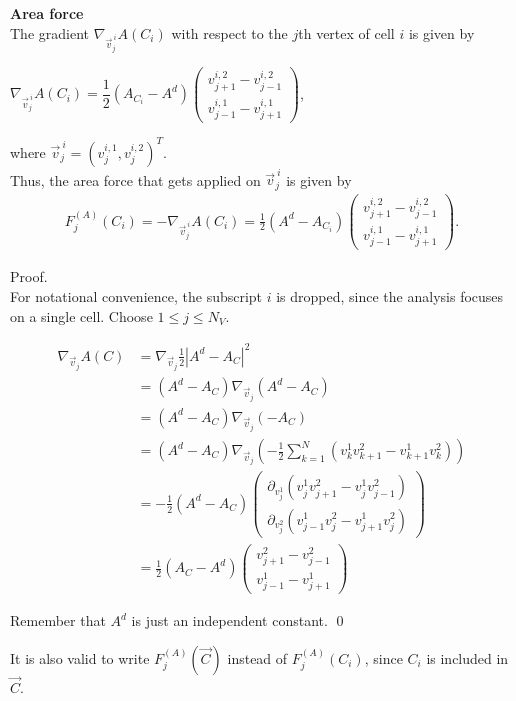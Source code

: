 \begin{proposition} \textbf{Area force} \label{force:area}\\
	The gradient $\nabla_{\vec{v}^{\: i}_j} A(C_i)$ with respect to the $j$th vertex of cell $i$ is given by 
	\begin{center}
		$\nabla_{\vec{v}^{\: i}_j} A(C_i) = \dfrac{1}{2} (A_{C_i} - A^d) \begin{pmatrix} v_{j+1}^{i,2} - v_{j-1}^{i,2} \\[0.5em]  v_{j-1}^{i,1} - v_{j+1}^{i,1} \end{pmatrix}$, 
	\end{center}
	where $\vec{v}^{\: i}_j = (v_{j}^{i,1}, v_{j}^{i,2})^T$. \\

	Thus, the area force that gets applied on $\vec{v}^{\: i}_j$ is given by 
	\begin{align}
		F_{j}^{(A)}(C_i) 
		= - \nabla_{\vec{v}^{\: i}_j} A(C_i) 
		= \frac{1}{2}(A^d - A_{C_i}) \begin{pmatrix} v_{j+1}^{i,2} - v_{j-1}^{i,2} \\[0.5em]  v_{j-1}^{i,1} - v_{j+1}^{i,1} \end{pmatrix}.
	\end{align}



	Proof.\\
	For notational convenience, the subscript $i$ is dropped, since the analysis focuses on a single cell.
	Choose $1 \leq j \leq N_V$.  
 
	\begin{align*}
		\nabla_{\vec{v}_j} A(C) &= \nabla_{\vec{v}_j} \frac{1}{2} | A^d - A_{C} |^2  \\ 
		&=  (A^d - A_{C}) \nabla_{\vec{v}_j} (A^d - A_{C}) \\
		&=   (A^d - A_{C}) \nabla_{\vec{v}_j} ( - A_{C}) \\ 
		&=   (A^d - A_{C}) \nabla_{\vec{v}_j} ( - \frac{1}{2} \sum\limits_{k = 1}^{N} (v_k^1 v_{k+1}^2 - v_{k+1}^1 v_k^2)) \\[0.5em]  
		&=   - \frac{1}{2} (A^d - A_{C}) \begin{pmatrix}
			\partial_{v_j^1} (v_j^1 v_{j+1}^2 - v_j^1 v_{j-1}^2)  \\[0.5em]
			\partial_{v_j^2} (v_{j-1}^1 v_j^2 - v_{j+1}^1 v_j^2)
		\end{pmatrix} \\[0.5em] 
		&=   \frac{1}{2} (A_{C} - A^d) \begin{pmatrix}
			  v_{j+1}^2 - v_{j-1}^2  \\
			 v_{j-1}^1  - v_{j+1}^1 
		\end{pmatrix} 
	\end{align*}

	Remember that $A^d$ is just an independent constant. 
	\qed
\end{proposition}
It is also valid to write $F_{j}^{(A)}(\vec{C})$ instead of $F_{j}^{(A)}(C_i)$, since $C_i$ is included in $\vec{C}$. 


